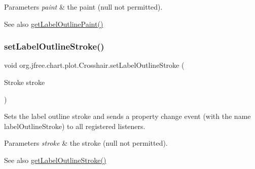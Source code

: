 \begin{DoxyParams}{Parameters}
{\em paint} & the paint ({\ttfamily null} not permitted).\\
\hline
\end{DoxyParams}
\begin{DoxySeeAlso}{See also}
\mbox{\hyperlink{classorg_1_1jfree_1_1chart_1_1plot_1_1_crosshair_ac01f9a5456e085677ea18840da944de0}{get\+Label\+Outline\+Paint()}} 
\end{DoxySeeAlso}
\mbox{\label{classorg_1_1jfree_1_1chart_1_1plot_1_1_crosshair_a27fd7cb8534fb687f4f6209ec8fb1481}} 
\subsubsection{\texorpdfstring{set\+Label\+Outline\+Stroke()}{setLabelOutlineStroke()}}
{\footnotesize\ttfamily void org.\+jfree.\+chart.\+plot.\+Crosshair.\+set\+Label\+Outline\+Stroke (\begin{DoxyParamCaption}\item[{Stroke}]{stroke }\end{DoxyParamCaption})}

Sets the label outline stroke and sends a property change event (with the name \textquotesingle{}label\+Outline\+Stroke\textquotesingle{}) to all registered listeners.


\begin{DoxyParams}{Parameters}
{\em stroke} & the stroke ({\ttfamily null} not permitted).\\
\hline
\end{DoxyParams}
\begin{DoxySeeAlso}{See also}
\mbox{\hyperlink{classorg_1_1jfree_1_1chart_1_1plot_1_1_crosshair_add1e46ed0170bc4cdb461d36229f481c}{get\+Label\+Outline\+Stroke()}} 
\end{DoxySeeAlso}
\mbox{\label{classorg_1_1jfree_1_1chart_1_1plot_1_1_crosshair_aaaf481eb9eccc5fa2b4f2a972f1aa1be}} 
